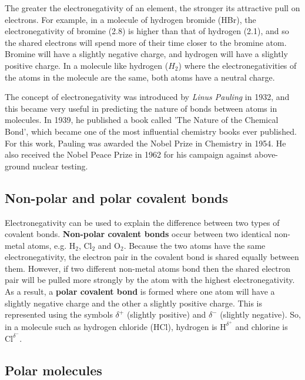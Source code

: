 The greater the electronegativity of an element, the stronger its attractive pull on electrons. For example, in a molecule of hydrogen bromide (HBr), the electronegativity of bromine (2.8) is higher than that of hydrogen (2.1), and so the shared electrons will spend more of their time closer to the bromine atom. Bromine will have a slightly negative charge, and hydrogen will have a slightly positive charge. In a molecule like hydrogen ($H_{2}$) where the electronegativities of the atoms in the molecule are the same, both atoms have a neutral charge. \\

\begin{IFact}{
The concept of electronegativity was introduced by \textit{Linus Pauling} in 1932, and this became very useful in predicting the nature of bonds between atoms in molecules. In 1939, he published a book called 'The Nature of the Chemical Bond', which became one of the most influential chemistry books ever published. For this work, Pauling was awarded the Nobel Prize in Chemistry in 1954. He also received the Nobel Peace Prize in 1962 for his campaign against above-ground nuclear testing.
}
\end{IFact}

\subsection{Non-polar and polar covalent bonds}

Electronegativity can be used to explain the difference between two
types of covalent bonds. \textbf{Non-polar covalent bonds} occur between two
identical non-metal atoms, e.g. H$_2$, Cl$_2$ and O$_2$. Because the two atoms
have the same electronegativity, the electron pair in the covalent
bond is shared equally between them. However, if two different
non-metal atoms bond then the shared electron pair will be pulled more
strongly by the atom with the highest electronegativity. As a result, a \textbf{polar covalent bond} is formed where one atom will have a slightly negative charge and the other a slightly
positive charge. This is represented using the symbols $\delta^{+}$ (slightly positive) and $\delta^{-}$ (slightly negative). So, in a molecule such as hydrogen chloride (HCl), hydrogen is $\text{H}^{\delta^{+}}$ and chlorine is $\text{Cl}^{\delta^{-}}$.

\subsection{Polar molecules}

